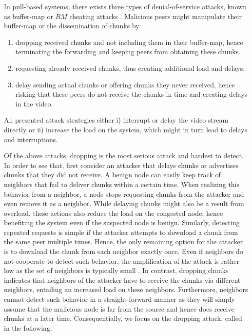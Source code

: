 In pull-based systems, there exists three types of denial-of-service attacks, known as buffer-map or $BM$ cheating attacks \cite{cheatingAnalysis}. 
Malicious peers might manipulate their buffer-map or the dissemination of chunks by: 
\begin{enumerate}
\item dropping received chunks and not including them in their buffer-map, hence terminating the forwarding and keeping peers from obtaining these chunks.
\item requesting already received chunks, thus creating additional load and delays.
\item delay sending actual chunks or offering chunks they never received, hence risking that these peers do not receive the chunks in time and creating delays in the video. 
\end{enumerate}
All presented attack strategies either i) interrupt or delay the video stream directly or ii) increase the load on the system, which might in turn lead to delays and interruptions. 


Of the above attacks, dropping is the most serious attack and hardest to detect.
In order to see that, first consider an attacker that delays chunks or advertises chunks that they did not receive. A benign node can easily keep track of neighbors that fail to deliver chunks within a certain time. When realizing this behavior from a neighbor, a node stops requesting chunks from the attacker and even remove it as a neighbor. While delaying chunks might also be a result from overload, these actions also reduce the load on the congested node, hence benefiting the system even if the suspected node is benign. 
Similarly, detecting repeated requests is simple if the attacker attempts to download a chunk from the same peer multiple times. Hence, the only remaining option for the attacker is to download the chunk from each neighbor exactly once. Even if neighbors do not cooperate to detect such behavior, the amplification of the attack is rather low as the set of neighbors is typically small \cite{neighborlist1,neighborlist2}. 
In contrast, dropping chunks indicates that neighbors of the attacker have to receive the chunks via different neighbors, entailing an increased  load on these neighbors. Furthermore, neighbors cannot detect such behavior in a straight-forward manner as they will simply assume that the malicious node is far from the source and hence does receive chunks at a later time. 
Consequentially, we focus on the dropping attack, called \drop in the following. 

